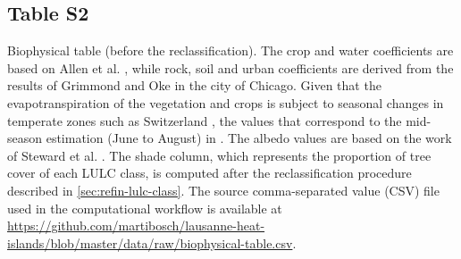 \documentclass[10pt,letterpaper]{article}
\begin{document}
\subsection*{Table S2}
\label{table-biophysical}

Biophysical table (before the reclassification). The crop and water coefficients are based on Allen et al. \cite{allen1998crop}, while rock, soil and urban coefficients are derived from the results of Grimmond and Oke \cite{grimmond1999evapotranspiration} in the city of Chicago. Given that the evapotranspiration of the vegetation and crops is subject to seasonal changes in temperate zones such as Switzerland \cite{allen1998crop}, the values that correspond to the mid-season estimation (June to August) in \cite{nistor2016mapping}.
The albedo values are based on the work of Steward et al. \cite{stewart2012local}.
The shade column, which represents the proportion of tree cover of each LULC class, is computed after the reclassification procedure described in \autoref{sec:refin-lulc-class}.
The source comma-separated value (CSV) file used in the computational workflow is available at \url{https://github.com/martibosch/lausanne-heat-islands/blob/master/data/raw/biophysical-table.csv}.
\end{document}
